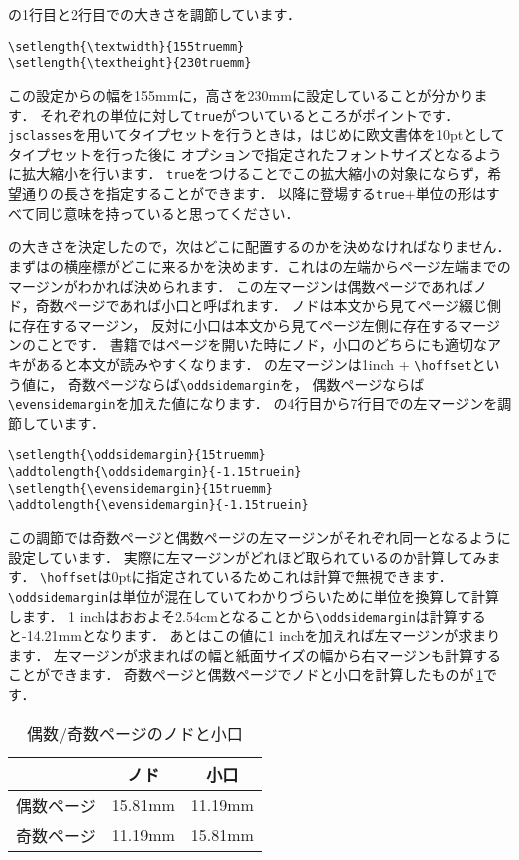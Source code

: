 の1行目と2行目での大きさを調節しています．
\begin{verbatim}
\setlength{\textwidth}{155truemm}
\setlength{\textheight}{230truemm}
\end{verbatim}

この設定からの幅を155mmに，高さを230mmに設定していることが分かります．
それぞれの単位に対して\texttt{true}がついているところがポイントです．
\texttt{jsclasses}を用いてタイプセットを行うときは，はじめに欧文書体を10ptとしてタイプセットを行った後に
オプションで指定されたフォントサイズとなるように拡大縮小を行います．
\texttt{true}をつけることでこの拡大縮小の対象にならず，希望通りの長さを指定することができます．
以降に登場する\texttt{true}+単位の形はすべて同じ意味を持っていると思ってください．

の大きさを決定したので，次はどこに配置するのかを決めなければなりません．
まずはの横座標がどこに来るかを決めます．これはの左端からページ左端までのマージンがわかれば決められます．
この左マージンは偶数ページであればノド，奇数ページであれば小口と呼ばれます．
ノドは本文から見てページ綴じ側に存在するマージン，
反対に小口は本文から見てページ左側に存在するマージンのことです．
書籍ではページを開いた時にノド，小口のどちらにも適切なアキがあると本文が読みやすくなります．
の左マージンは1inch + \verb|\hoffset|という値に，
奇数ページならば\verb|\oddsidemargin|を，
偶数ページならば\verb|\evensidemargin|を加えた値になります．
の4行目から7行目での左マージンを調節しています．

\begin{verbatim}
\setlength{\oddsidemargin}{15truemm}
\addtolength{\oddsidemargin}{-1.15truein}
\setlength{\evensidemargin}{15truemm}
\addtolength{\evensidemargin}{-1.15truein}
\end{verbatim}

この調節では奇数ページと偶数ページの左マージンがそれぞれ同一となるように設定しています．
実際に左マージンがどれほど取られているのか計算してみます．
\verb|\hoffset|は0ptに指定されているためこれは計算で無視できます．
\verb|\oddsidemargin|は単位が混在していてわかりづらいために単位を換算して計算します．
1 inchはおおよそ2.54cmとなることから\verb|\oddsidemargin|は計算すると-14.21mmとなります．
あとはこの値に1 inchを加えれば左マージンが求まります．
左マージンが求まればの幅と紙面サイズの幅から右マージンも計算することができます．
奇数ページと偶数ページでノドと小口を計算したものが\tablename\,\ref{tbl:oddevenmargins}です．
\begin{table}[!ht]
	\centering
	\caption{偶数/奇数ページのノドと小口}
	\label{tbl:oddevenmargins}
	\begin{tabular}{c|cc} \hline \hline
		& ノド & 小口 \\ \hline
		偶数ページ & 15.81mm & 11.19mm \\
		奇数ページ & 11.19mm & 15.81mm \\ \hline
	\end{tabular}
\end{table} 

